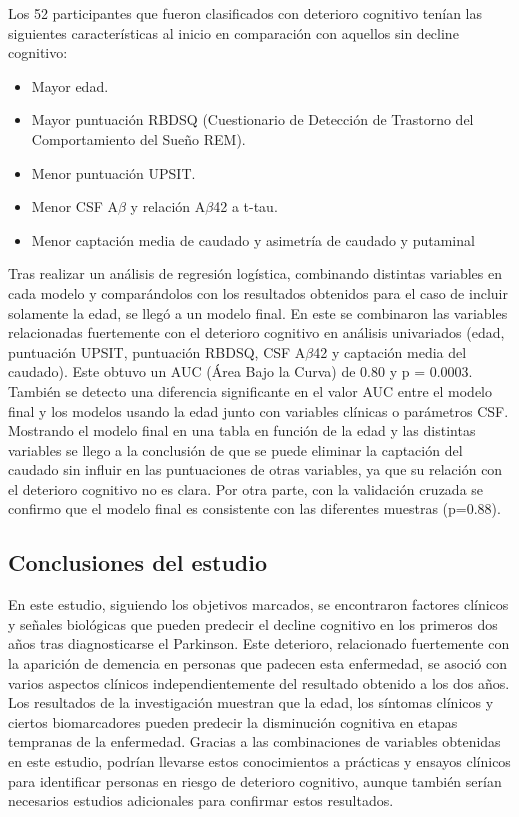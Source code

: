 		Los 52 participantes que fueron clasificados con deterioro cognitivo tenían las siguientes características al inicio en comparación con aquellos sin decline cognitivo:
		\begin{itemize}
			\item Mayor edad.
			\item Mayor puntuación RBDSQ (Cuestionario de Detección de Trastorno del Comportamiento del Sueño REM).
			\item Menor puntuación UPSIT.
			\item Menor CSF A$\beta$ y relación A$\beta$42 a t-tau.
			\item Menor captación media de caudado y
			asimetría de caudado y putaminal
		\end{itemize}	
		
		Tras realizar un análisis de regresión logística, combinando distintas variables en cada modelo y comparándolos con los resultados obtenidos para el caso de incluir solamente la edad, se llegó a un modelo final. En este se combinaron las variables relacionadas fuertemente con el deterioro cognitivo en análisis univariados (edad, puntuación UPSIT, puntuación RBDSQ, CSF A$\beta$42 y captación media del caudado). Este obtuvo un AUC (Área Bajo la Curva) de 0.80 y p = 0.0003. También se detecto una diferencia significante en el valor AUC entre el modelo final y los modelos usando la edad junto con variables clínicas o parámetros CSF. Mostrando el modelo final en una tabla en función de la edad y las distintas variables se llego a la conclusión de que se puede eliminar la captación del caudado sin influir en las puntuaciones de otras variables, ya que su relación con el deterioro cognitivo no es clara. Por otra parte, con la validación cruzada se confirmo que el modelo final es consistente con las diferentes muestras (p=0.88).\\
		
		\subsection{Conclusiones del estudio}
		
		En este estudio, siguiendo los objetivos marcados, se encontraron factores clínicos y señales biológicas que pueden predecir el decline cognitivo en los primeros dos años tras diagnosticarse el Parkinson. Este deterioro, relacionado fuertemente con la aparición de demencia en personas que padecen esta enfermedad, se asoció con varios aspectos clínicos independientemente del resultado obtenido a los dos años. Los resultados de la investigación muestran que la edad, los síntomas clínicos y ciertos biomarcadores pueden predecir la disminución cognitiva en etapas tempranas de la enfermedad. Gracias a las combinaciones de variables obtenidas en este estudio, podrían llevarse estos conocimientos a prácticas y ensayos clínicos para identificar personas en riesgo de deterioro cognitivo, aunque también serían necesarios estudios adicionales para confirmar estos resultados.
	
	
	
	
	
